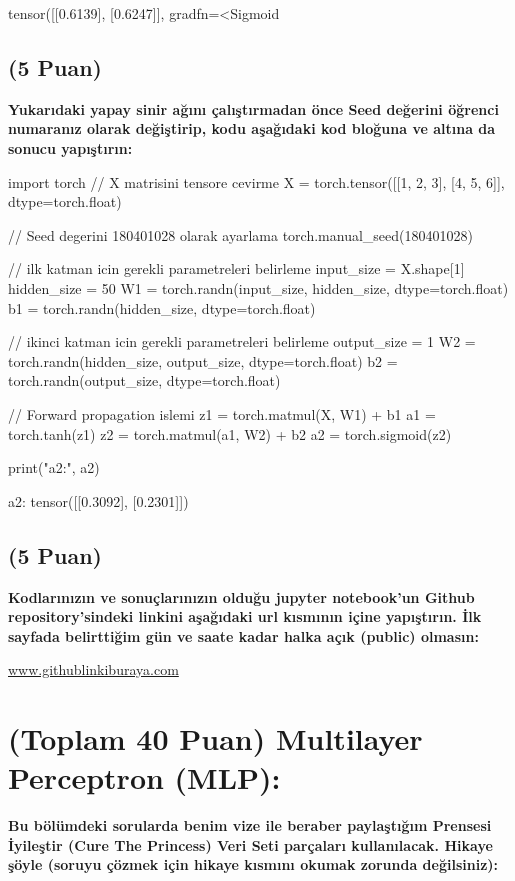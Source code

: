 \documentclass[11pt]{article}
\begin{document}
tensor([[0.6139],
        [0.6247]], gradfn=<Sigmoid



\subsection{(5 Puan)} \textbf{Yukarıdaki yapay sinir ağını çalıştırmadan önce Seed değerini öğrenci numaranız olarak değiştirip, kodu aşağıdaki kod bloğuna ve altına da sonucu yapıştırın:}

\begin{python}
import torch
// X matrisini tensore cevirme
X = torch.tensor([[1, 2, 3], [4, 5, 6]], dtype=torch.float)

// Seed degerini 180401028 olarak ayarlama
torch.manual_seed(180401028)

// ilk katman icin gerekli parametreleri belirleme
input_size = X.shape[1]
hidden_size = 50
W1 = torch.randn(input_size, hidden_size, dtype=torch.float)
b1 = torch.randn(hidden_size, dtype=torch.float)

// ikinci katman icin gerekli parametreleri belirleme
output_size = 1
W2 = torch.randn(hidden_size, output_size, dtype=torch.float)
b2 = torch.randn(output_size, dtype=torch.float)

// Forward propagation islemi
z1 = torch.matmul(X, W1) + b1
a1 = torch.tanh(z1)
z2 = torch.matmul(a1, W2) + b2
a2 = torch.sigmoid(z2)

print("a2:", a2)
\end{python}

a2: tensor([[0.3092],
        [0.2301]])

\subsection{(5 Puan)} \textbf{Kodlarınızın ve sonuçlarınızın olduğu jupyter notebook'un Github repository'sindeki linkini aşağıdaki url kısmının içine yapıştırın. İlk sayfada belirttiğim gün ve saate kadar halka açık (public) olmasın:}

\url{www.githublinkiburaya.com}

\section{(Toplam 40 Puan) Multilayer Perceptron (MLP):} 
\textbf{Bu bölümdeki sorularda benim vize ile beraber paylaştığım Prensesi İyileştir (Cure The Princess) Veri Seti parçaları kullanılacak. Hikaye şöyle (soruyu çözmek için hikaye kısmını okumak zorunda değilsiniz):} 
\end{document}
